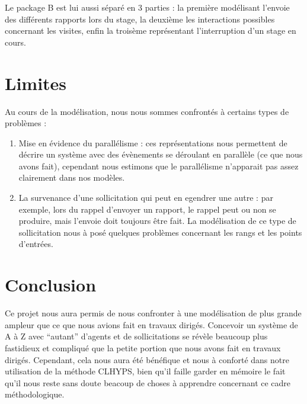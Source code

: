 \documentclass[12pt,a4paper]{article}
\begin{document}
Le package B est lui aussi séparé en 3 parties : la première modélisant l'envoie
des différents rapports lors du stage, la deuxième les interactions possibles
concernant les visites, enfin la troisème représentant l'interruption d'un stage
en cours.

{
    \newpage {} 
    
    \restoregeometry {} \newpage
}

{
    \newpage {} 
    
    \restoregeometry {} \newpage
}

{
    \newpage {} 
    
    \restoregeometry {} \newpage
}

\section{Limites}

Au cours de la modélisation, nous nous sommes confrontés à certains types de
problèmes :
\begin{enumerate}
    \item Mise en évidence du parallélisme : ces représentations nous permettent
        de décrire un système avec des évènements se déroulant en parallèle (ce
        que nous avons fait), cependant nous estimons que le parallélisme
        n'apparait pas assez clairement dans nos modèles.
    \item La survenance d'une sollicitation qui peut en egendrer une autre : par
        exemple, lors du rappel d'envoyer un rapport, le rappel peut ou non se
        produire, mais l'envoie doit toujours être fait. La modélisation de ce
        type de sollicitation nous à posé quelques problèmes concernant les
        rangs et les points d'entrées.
\end{enumerate}

\section{Conclusion}

Ce projet nous aura permis de nous confronter à une modélisation de plus grande
ampleur que ce que nous avions fait en travaux dirigés. Concevoir un système de
A à Z avec \enquote{autant} d'agents et de sollicitations se révèle beaucoup
plus fastidieux et compliqué que la petite portion que nous avons fait en
travaux dirigés. Cependant, cela nous aura été bénéfique et nous à conforté dans
notre utilisation de la méthode CLHYPS, bien qu'il faille garder en mémoire le
fait qu'il nous reste sans doute beacoup de choses à apprendre concernant ce
cadre méthodologique.
\end{document}
